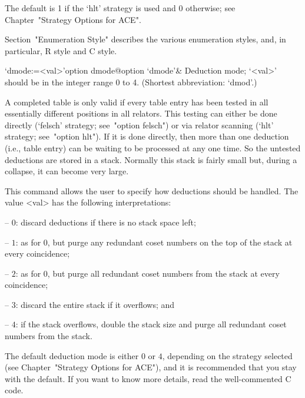 \endlist

The default is 1 if the `hlt' strategy is used and  0  otherwise;  see
Chapter~"Strategy Options for ACE".

Section~"Enumeration Style" describes the various enumeration  styles,
and, in particular, R style and C style.

\enditems


\beginitems

\>`dmode:=<val>'{option dmode}@{option `dmode'}&
Deduction mode; `<val>' should be in the integer range 0 to 4.
(Shortest abbreviation: `dmod'.)

A completed table  is only valid if every table  entry has been tested
in all essentially different  positions in all relators.  This testing
can either be done directly (`felsch' strategy;  see~"option  felsch")
or via relator scanning (`hlt' strategy; see~"option hlt"). If  it  is
done directly, then more than one deduction (i.e., table entry) can be
waiting to be processed at any one time. So  the  untested  deductions
are stored in a stack. Normally this stack is fairly small but, during
a collapse, it can become very large.

This command allows the user  to  specify  how  deductions  should  be
handled. The value <val> has the following interpretations:

\beginlist%

\item{--} $0$:  
discard deductions if there is no stack space left;

\item{--} $1$: 
as for $0$, but purge any redundant coset numbers on the  top  of  the
stack at every coincidence;

\item{--} $2$: 
as for 0, but purge all redundant coset  numbers  from  the  stack  at
every coincidence;

\item{--} $3$:
discard the entire stack if it overflows; and

\item{--} $4$:
if the stack overflows, double the stack size and purge all  redundant
coset numbers from the stack.

\endlist

The default deduction mode is either $0$  or  $4$,  depending  on  the
strategy selected (see Chapter~"Strategy Options for ACE"), and it  is
recommended that you stay with the default. If you want to  know  more
details, read the well-commented C code.

